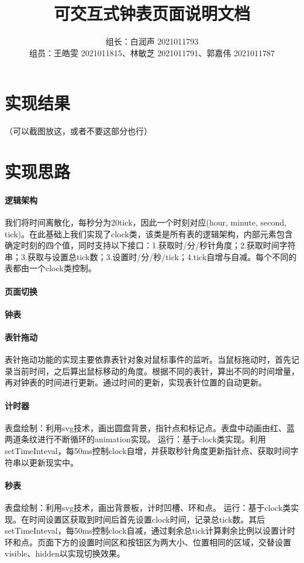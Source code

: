 \documentclass[UTF8]{ctexart}
\title{可交互式钟表页面说明文档}
\author{组长：白润声 2021011793 \\ 组员：王皓雯 2021011815、林敏芝 2021011791、郭嘉伟 2021011787}
\date{}
\begin{document}
	\maketitle
	\section{实现结果}
	（可以截图放这，或者不要这部分也行）
	\section{实现思路} %
	\paragraph{逻辑架构}
	我们将时间离散化，每秒分为20tick，因此一个时刻对应(hour, minute, second, tick)。在此基础上我们实现了clock类，该类是所有表的逻辑架构，内部元素包含确定时刻的四个值，同时支持以下接口：1.获取时/分/秒针角度；2.获取时间字符串；3.获取与设置总tick数；3.设置时/分/秒/tick；4.tick自增与自减。每个不同的表都由一个clock类控制。
	\paragraph{页面切换}
	
	\paragraph{钟表}
	
	\paragraph{表针拖动}
	表针拖动功能的实现主要依靠表针对象对鼠标事件的监听。当鼠标拖动时，首先记录当前时间，之后算出鼠标移动的角度。根据不同的表针，算出不同的时间增量，再对钟表的时间进行更新。通过时间的更新，实现表针位置的自动更新。
	\paragraph{计时器}
	表盘绘制：利用svg技术，画出圆盘背景，指针点和标记点。表盘中动画由红、蓝两道条纹进行不断循环的animation实现。
	运行：基于clock类实现。利用setTimeInteval，每50ms控制clock自增，并获取秒针角度更新指针点、获取时间字符串以更新现实中。
	\paragraph{秒表}
	表盘绘制：利用svg技术，画出背景板，计时凹槽、环和点。
	运行：基于clock类实现。在时间设置区获取到时间后首先设置clock时间，记录总tick数。其后setTimeInteval，每50ms控制clock自减，通过剩余总tick计算剩余比例以设置计时环和点。页面下方的设置时间区和按钮区为两大小、位置相同的区域，交替设置visible、hidden以实现切换效果。
\end{document}
